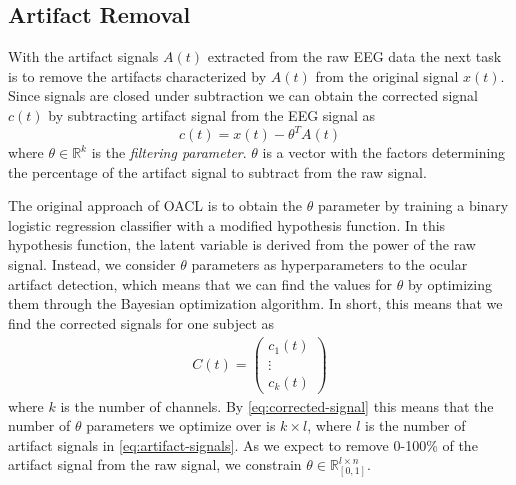 \subsection{Artifact Removal}
With the artifact signals $A(t)$ extracted from the raw EEG data the next task is to remove the artifacts characterized by $A(t)$ from the original signal $x(t)$. Since signals are closed under subtraction we can obtain the corrected signal $c(t)$ by subtracting artifact signal from the EEG signal as
\begin{equation}\label{eq:corrected-signal}
c(t) = x(t) - \theta^T A(t)
\end{equation}
where $\theta \in \mathbb{R}^{k}$ is the \emph{filtering parameter}. $\theta$ is a vector with the factors determining the percentage of the artifact signal to subtract from the raw signal. 

The original approach of OACL is to obtain the $\theta$ parameter by training a binary logistic regression classifier with a modified hypothesis function. In this hypothesis function, the latent variable is derived from the power of the raw signal. Instead, we consider $\theta$ parameters as hyperparameters to the ocular artifact detection, which means that we can find the values for $\theta$ by optimizing them through the Bayesian optimization algorithm. In short, this means that we find the corrected signals for one subject as
\begin{align}\label{eq:corrected-signal}
C(t)=  \begin{pmatrix}
c_1(t) \\
\vdots  \\
c_{k}(t) 
\end{pmatrix}
\end{align}
where $k$ is the number of channels. By \cref{eq:corrected-signal} this means that the number of $\theta$ parameters we optimize over is $k \times l$, where $l$ is the number of artifact signals in \cref{eq:artifact-signals}. As we expect to remove 0-100\% of the artifact signal from the raw signal, we constrain $\theta \in \mathbb{R}^{l\times n}_{[0,1]}$.

